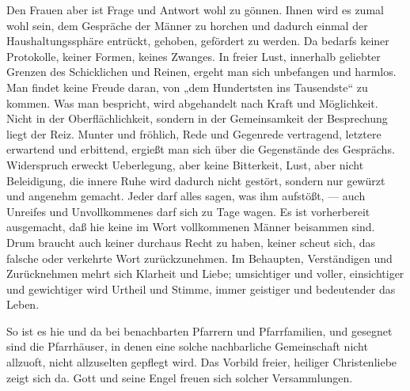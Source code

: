 Den Frauen aber ist Frage und Antwort wohl zu gönnen. Ihnen wird es zumal wohl sein, dem Gespräche der Männer zu horchen und dadurch einmal der Haushaltungssphäre entrückt, gehoben, gefördert zu werden. Da bedarfs keiner Protokolle, keiner Formen, keines Zwanges. In freier Lust, innerhalb geliebter Grenzen des Schicklichen und Reinen, ergeht man sich unbefangen und harmlos. Man findet keine Freude daran, von „dem Hundertsten ins Tausendste“ zu kommen. Was man bespricht, wird abgehandelt nach Kraft und Möglichkeit. Nicht in der Oberflächlichkeit, sondern in der Gemeinsamkeit der Besprechung liegt der Reiz. Munter und fröhlich, Rede und Gegenrede vertragend, letztere erwartend und erbittend, ergießt man sich über die Gegenstände des Gesprächs. Widerspruch erweckt Ueberlegung, aber keine Bitterkeit, Lust, aber nicht Beleidigung, die innere Ruhe wird dadurch nicht gestört, sondern nur gewürzt und angenehm gemacht. Jeder darf alles sagen, was ihm aufstößt, — auch Unreifes und Unvollkommenes darf sich zu Tage wagen. Es ist vorherbereit ausgemacht, daß hie keine im Wort vollkommenen Männer beisammen sind. Drum braucht auch keiner durchaus Recht zu haben, keiner scheut sich, das falsche oder verkehrte Wort zurückzunehmen. Im Behaupten, Verständigen und Zurücknehmen mehrt sich Klarheit und Liebe; umsichtiger und voller, einsichtiger und gewichtiger wird Urtheil und Stimme, immer geistiger und bedeutender das Leben.

So ist es hie und da bei benachbarten Pfarrern und Pfarrfamilien, und gesegnet sind die Pfarrhäuser, in denen eine solche nachbarliche Gemeinschaft nicht allzuoft, nicht
allzuselten gepflegt wird. Das Vorbild freier, heiliger Christenliebe zeigt sich da. Gott und seine Engel freuen sich solcher Versammlungen.

